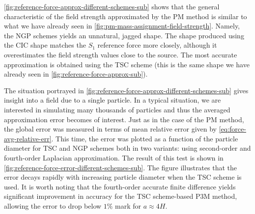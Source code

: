 \autoref{fig:reference-force-approx-different-schemes-sub} shows that the general characteristic of the field strength approximated by the PM method is similar to what we have already seen in \autoref{fig:pm-mass-assignment-field-strength}.
Namely, the NGP schemes yields an unnatural, jagged shape.
The shape produced using the CIC shape matches the $S_1$ reference force more closely, although it overestimates the field strength values close to the source.
The most accurate approximation is obtained using the TSC scheme (this is the same shape we have already seen in \autoref{fig:reference-force-approx-sub}).

The situation portrayed in \autoref{fig:reference-force-approx-different-schemes-sub} gives insight into a field due to a single particle.
In a typical situation, we are interested in simulating many thousands of particles and thus the averaged approximation error becomes of interest.
Just as in the case of the PM method, the global error was measured in terms of mean relative error given by \autoref{eq:force-avg-relative-err}.
This time, the error was plotted as a function of the particle diameter for TSC and NGP schemes both in two variants: using second-order and fourth-order Laplacian approximation.
The result of this test is shown in \autoref{fig:reference-force-error-different-schemes-sub}.
The figure illustrates that the error decays rapidly with increasing particle diameter when the TSC scheme is used.
It is worth noting that the fourth-order accurate finite difference yields significant improvement in accuracy for the TSC scheme-based P3M method, allowing the error to drop below $1\%$ mark for $a \approx 4H$.


